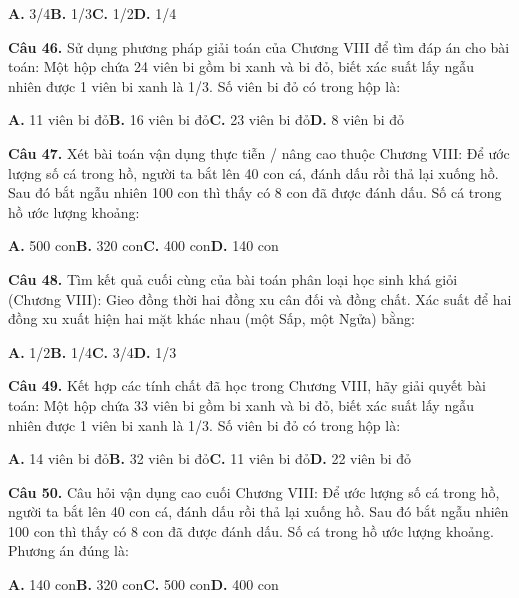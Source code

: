\documentclass[11pt,a4paper]{article}
\begin{document}
\hspace*{1.5em}\textbf{A.} 3/4\quad\quad \textbf{B.} 1/3\quad\quad \textbf{C.} 1/2\quad\quad \textbf{D.} 1/4\par\vspace{2pt}
\textbf{\color{primary} Câu 46.} Sử dụng phương pháp giải toán của Chương VIII để tìm đáp án cho bài toán: Một hộp chứa 24 viên bi gồm bi xanh và bi đỏ, biết xác suất lấy ngẫu nhiên được 1 viên bi xanh là 1/3. Số viên bi đỏ có trong hộp là:\par
\hspace*{1.5em}\textbf{A.} 11 viên bi đỏ\quad\quad \textbf{B.} 16 viên bi đỏ\quad\quad \textbf{C.} 23 viên bi đỏ\quad\quad \textbf{D.} 8 viên bi đỏ\par\vspace{2pt}
\textbf{\color{primary} Câu 47.} Xét bài toán vận dụng thực tiễn / nâng cao thuộc Chương VIII: Để ước lượng số cá trong hồ, người ta bắt lên 40 con cá, đánh dấu rồi thả lại xuống hồ. Sau đó bắt ngẫu nhiên 100 con thì thấy có 8 con đã được đánh dấu. Số cá trong hồ ước lượng khoảng:\par
\hspace*{1.5em}\textbf{A.} 500 con\quad\quad \textbf{B.} 320 con\quad\quad \textbf{C.} 400 con\quad\quad \textbf{D.} 140 con\par\vspace{2pt}
\textbf{\color{primary} Câu 48.} Tìm kết quả cuối cùng của bài toán phân loại học sinh khá giỏi (Chương VIII): Gieo đồng thời hai đồng xu cân đối và đồng chất. Xác suất để hai đồng xu xuất hiện hai mặt khác nhau (một Sấp, một Ngửa) bằng:\par
\hspace*{1.5em}\textbf{A.} 1/2\quad\quad \textbf{B.} 1/4\quad\quad \textbf{C.} 3/4\quad\quad \textbf{D.} 1/3\par\vspace{2pt}
\textbf{\color{primary} Câu 49.} Kết hợp các tính chất đã học trong Chương VIII, hãy giải quyết bài toán: Một hộp chứa 33 viên bi gồm bi xanh và bi đỏ, biết xác suất lấy ngẫu nhiên được 1 viên bi xanh là 1/3. Số viên bi đỏ có trong hộp là:\par
\hspace*{1.5em}\textbf{A.} 14 viên bi đỏ\quad\quad \textbf{B.} 32 viên bi đỏ\quad\quad \textbf{C.} 11 viên bi đỏ\quad\quad \textbf{D.} 22 viên bi đỏ\par\vspace{2pt}
\textbf{\color{primary} Câu 50.} Câu hỏi vận dụng cao cuối Chương VIII: Để ước lượng số cá trong hồ, người ta bắt lên 40 con cá, đánh dấu rồi thả lại xuống hồ. Sau đó bắt ngẫu nhiên 100 con thì thấy có 8 con đã được đánh dấu. Số cá trong hồ ước lượng khoảng. Phương án đúng là:\par
\hspace*{1.5em}\textbf{A.} 140 con\quad\quad \textbf{B.} 320 con\quad\quad \textbf{C.} 500 con\quad\quad \textbf{D.} 400 con\par\vspace{2pt}
\end{document}
